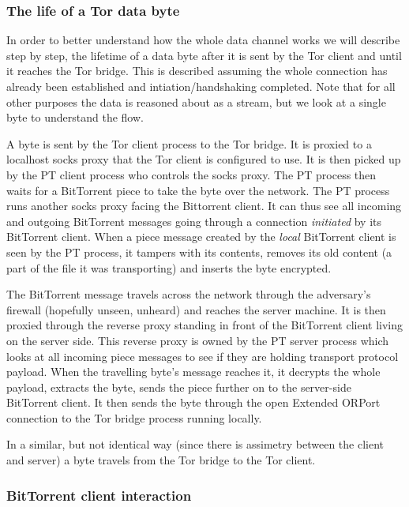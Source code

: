 \documentclass[11pt]{article} %
\begin{document}
\subsubsection{The life of a Tor data byte}

In order to better understand how the whole data channel works we will describe step by step, the lifetime of a data byte after it is sent by the Tor client and until it reaches the Tor bridge. This is described assuming the whole connection has already been established and intiation/handshaking completed. Note that for all other purposes the data is reasoned about as a stream, but we look at a single byte to understand the flow.

A byte is sent by the Tor client process to the Tor bridge. It is proxied to a localhost socks proxy that the Tor client is configured to use. It is then picked up by the PT client process who controls the socks proxy. The PT process then waits for a BitTorrent piece to take the byte over the network. The PT process runs another socks proxy facing the Bittorrent client. It can thus see all incoming and outgoing BitTorrent messages going through a connection \textit{initiated} by its BitTorrent client. When a piece message created by the \textit{local} BitTorrent client is seen by the PT process, it tampers with its contents, removes its old content (a part of the file it was transporting) and inserts the byte encrypted.  

The BitTorrent message travels across the network through the adversary's firewall (hopefully unseen, unheard) and reaches the server machine. It is then proxied through the reverse proxy standing in front of the BitTorrent client living on the server side. This reverse proxy is owned by the PT server process which looks at all incoming piece messages to see if they are holding transport protocol payload. When the travelling byte's message reaches it, it decrypts the whole payload, extracts the byte, sends the piece further on to the server-side BitTorrent client. It then sends the byte through the open Extended ORPort connection to the Tor bridge process running locally.

In a similar, but not identical way (since there is assimetry between the client and server) a byte travels from the Tor bridge to the Tor client.

\subsubsection{BitTorrent client interaction}
\end{document}
